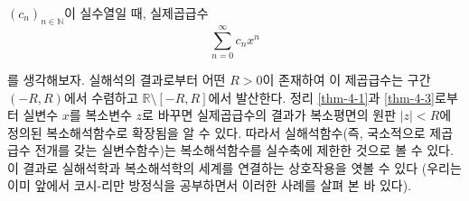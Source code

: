 \begin{salt_remark} \label{rem-4-1}
$(c_n)_{n\in\mathbb N}$이 실수열일 때,
실제곱급수
\[
\sum_{n=0}^\infty c_nx^n
\]
\end{salt_remark}
를 생각해보자. 실해석의 결과로부터 어떤 $R>0$이 존재하여
이 제곱급수는 구간 $(-R, R)$에서 수렴하고
$\mathbb R \setminus [-R,R]$에서 발산한다.
정리 \ref{thm-4-1}과 \ref{thm-4-3}로부터
실변수 $x$를 복소변수 $z$로 바꾸면 실제곱급수의 결과가 
복소평면의 원판 $|z|<R$에 정의된 복소해석함수로 확장됨을 알 수 있다.
따라서
실해석함수(즉, 국소적으로 제곱급수 전개를 갖는 실변수함수)는
복소해석함수를 실수축에 제한한 것으로 볼 수 있다.
이 결과로 실해석학과 복소해석학의 세계를 연결하는
상호작용을 엿볼 수 있다
(우리는 이미 앞에서 코시-리만 방정식을 공부하면서 이러한 사례를 살펴 본 바 있다).











